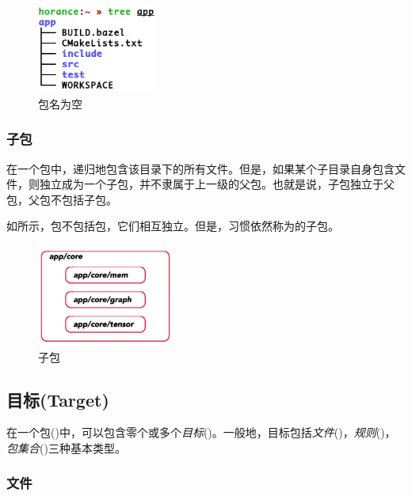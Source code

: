 \begin{content}
\begin{figure}[H]
\centering
\includegraphics[width=0.35\textwidth]{figures/bazel-concept-nil-package.png}
\caption{包名为空}
 \label{fig:bazel-concept-nil-package}
\end{figure}

\subsubsection{子包}

在一个包中，递归地包含该目录下的所有文件。但是，如果某个子目录自身包含文件，则独立成为一个子包，并不隶属于上一级的父包。也就是说，子包独立于父包，父包不包括子包。

如所示，包不包括包，它们相互独立。但是，习惯依然称为的子包。

\begin{figure}[H]
\centering
\includegraphics[width=0.4\textwidth]{figures/bazel-concept-subpackage.png}
\caption{子包}
 \label{fig:bazel-concept-subpackage}
\end{figure}



\subsection{目标(Target)}

在一个包()中，可以包含零个或多个\emph{目标}()。一般地，目标包括\emph{文件}()，\emph{规则}()，\emph{包集合}()三种基本类型。

\subsubsection{文件}


\end{content}
